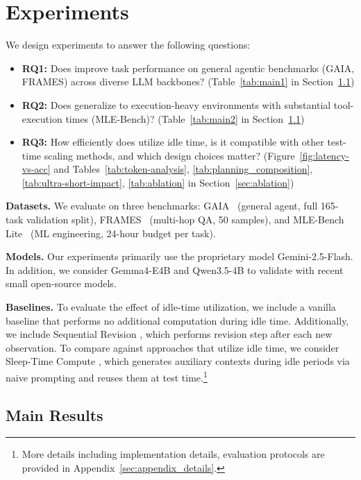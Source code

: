 \section{Experiments}
\label{sec:experiments}




We design experiments to answer the following questions:
\begin{itemize}[leftmargin=*,itemsep=0mm]
\item \textbf{RQ1:} Does \mname improve task performance on general agentic benchmarks (GAIA, FRAMES) across diverse LLM backbones? (Table~\ref{tab:main1} in Section~\ref{sec:main-results})
\item \textbf{RQ2:} Does \mname generalize to execution-heavy environments with substantial tool-execution times (MLE-Bench)? (Table~\ref{tab:main2} in Section~\ref{sec:main-results})
\item \textbf{RQ3:} How efficiently does \mname utilize idle time, is it compatible with other test-time scaling methods, and which design choices matter? (Figure~\ref{fig:latency-vs-acc} and Tables~\ref{tab:token-analysis}, \ref{tab:planning_composition}, \ref{tab:ultra-short-impact}, \ref{tab:ablation} in Section~\ref{sec:ablation})
\end{itemize}

\textbf{Datasets.}
We evaluate \mname on three benchmarks: GAIA~\cite{mialon2023gaia} (general agent, full 165-task validation split), FRAMES~\cite{krishna2024frames} (multi-hop QA, 50 samples), 
and MLE-Bench Lite~\cite{chan2024mle-bench} (ML engineering, 24-hour budget per task).

\textbf{Models.}
Our experiments primarily use the proprietary model Gemini-2.5-Flash.
In addition, we consider Gemma4-E4B and Qwen3.5-4B to validate \mname with recent small open-source models.

\textbf{Baselines.}
To evaluate the effect of idle-time utilization, we include a vanilla
baseline that performs no additional computation during idle time. Additionally, we include Sequential Revision \cite{zhu2025scaling}, which performs revision step after each new observation.
To compare against approaches that utilize idle time, we consider Sleep-Time Compute \cite{lin2025sleeptime}, which generates auxiliary contexts during idle periods via naive prompting and reuses them at test time.\footnote{More details including implementation details, evaluation protocols are provided in Appendix~\ref{sec:appendix_details}.}


\subsection{Main Results}\label{sec:main-results}

